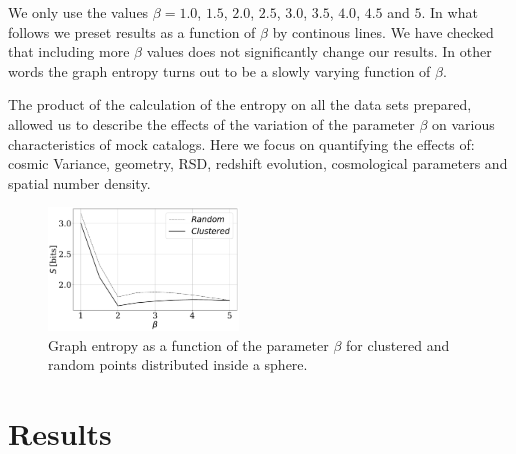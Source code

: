 \documentclass[fleqn,usenatbib]{mnras}
\begin{document}
We only use the values $\beta=1.0$, $1.5$, $2.0$, $2.5$, $3.0$, $3.5$, $4.0$, $4.5$ and $5$.
In what follows we preset results as a function of $\beta$ by continous lines.
We have checked that including more $\beta$ values does not significantly change
our results. 
In other words the graph entropy turns out to be a slowly varying function of $\beta$.


The product of the calculation of the entropy on all the data sets prepared, allowed us to
describe the effects of the variation of the parameter $\beta$ on various characteristics
of mock catalogs. 
Here we focus on quantifying the effects of: cosmic Variance, geometry, RSD, redshift
evolution, cosmological parameters and spatial number density.


\begin{figure}
    \includegraphics[width=0.45\textwidth]{entropy.pdf}
    \caption{Graph entropy as a function of the parameter $\beta$ 
    for clustered and random points distributed inside a sphere. \label{fig:entropy}}
\end{figure}




\section{Results}
\label{sec:results}
\end{document}
